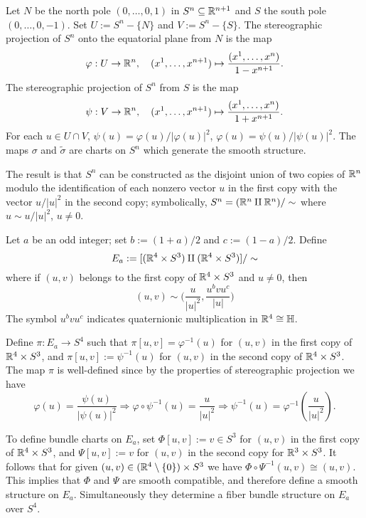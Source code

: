 \begin{example}
Let $N$ be the north pole $(0,\dots,0,1)$ in $S^n\subseteq\mathbb{R}^{n+1}$ and $S$ the south pole $(0,\dots,0,-1)$. Set $U:=S^n-\{N\}$ and $V:=S^n-\{S\}$. The stereographic 
projection of $S^n$ onto the equatorial plane from $N$ is the map
\[\varphi:U\to\mathbb{R}^n,\quad (x^1,\dots,x^{n+1})\mapsto\frac{(x^1,\dots,x^n)}{1-x^{n+1}}.\]
The stereographic projection of $S^n$ from $S$ is the map
\[\psi:V\to\mathbb{R}^n,\quad (x^1,\dots,x^{n+1})\mapsto\frac{(x^1,\dots,x^n)}{1+x^{n+1}}.\]
For each $u\in U\cap V$, $\psi(u)=\varphi(u)/|\varphi(u)|^2$, $\varphi(u)=\psi(u)/|\psi(u)|^2$. The maps $\sigma$ and $\widetilde{\sigma}$ are charts on $S^n$ which generate the smooth structure.\par
The result is that $S^n$ can be constructed as the disjoint union of two copies of $\mathbb{R}^n$ modulo the identification of each nonzero vector $u$ in the first copy with 
the vector $u/|u|^2$ in the second copy; symbolically, $S^n=(\mathbb{R}^n\amalg\mathbb{R}^n)/\sim$ where $u\sim u/|u|^2$, $u\neq 0$.\par
Let $a$ be an odd integer; set $b:=(1+a)/2$ and $c:=(1-a)/2$. Define
\[E_a:=[(\mathbb{R}^4\times S^3)\amalg(\mathbb{R}^4\times S^3)]/\sim\]
where if $(u,v)$ belongs to the first copy of $\mathbb{R}^4\times S^3$ and $u\neq 0$, then
\[(u,v)\sim\Big(\frac{u}{|u|^2},\frac{u^bvu^c}{|u|}\Big)\]
The symbol $u^bvu^c$ indicates quaternionic multiplication in $\mathbb{R}^4\cong\mathbb{H}$.\par
Define $\pi:E_a\to S^4$ such that $\pi[u,v]=\varphi^{-1}(u)$ for $(u,v)$ in the first copy of $\mathbb{R}^4\times S^3$, and $\pi[u,v]:=\psi^{-1}(u)$ for $(u,v)$ in 
the second copy of $\mathbb{R}^4\times S^3$. The map $\pi$ is well-defined since by the properties of stereographic projection we have
\[\varphi(u)=\frac{\psi(u)}{|\psi(u)|^2}\Rightarrow\varphi\circ\psi^{-1}(u)=\frac{u}{|u|^2}\Rightarrow\psi^{-1}(u)=\varphi^{-1}(\frac{u}{|u|^2}).\]

To define bundle charts on $E_a$, set $\varPhi[u,v]:=v\in S^3$ for $(u,v)$ in the first copy of $\mathbb{R}^4\times S^3$, and $\varPsi[u,v]:=v$ for $(u,v)$ in the second
copy for $\mathbb{R}^3\times S^3$. It follows that for given $(u,v)\in(\mathbb{R}^4\setminus\{0\})\times S^3$ we have $\varPhi\circ\varPsi^{-1}(u,v)\cong(u,v)$. This implies that $\varPhi$ and 
$\varPsi$ are smooth compatible, and therefore define a smooth structure on $E_a$. Simultaneously they determine a fiber bundle structure on $E_a$ over $S^4$.
\end{example}
